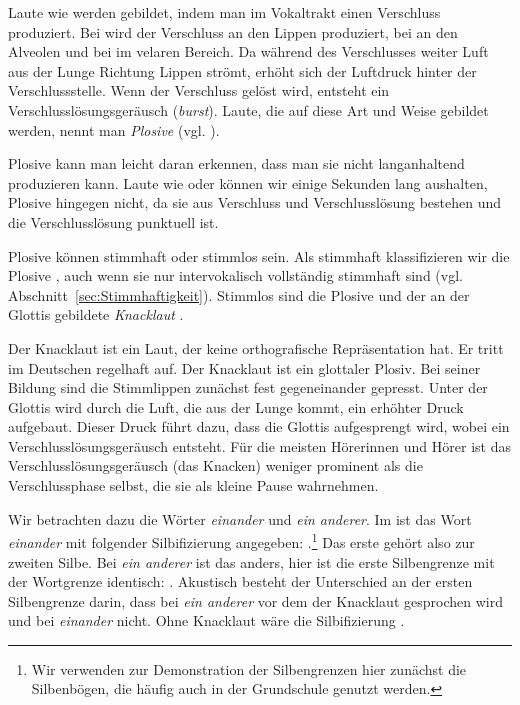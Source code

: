 Laute wie \textipa{[p, d, k]} werden gebildet, indem man im Vokaltrakt einen Verschluss produziert. Bei \textipa{[p]}wird der Verschluss an den Lippen produziert, bei \textipa{[d]} an den Alveolen und bei \textipa{[k]} im velaren Bereich. Da während des Verschlusses weiter Luft aus der Lunge Richtung Lippen strömt, erhöht sich der Luftdruck hinter der Verschlussstelle. Wenn der Verschluss gelöst wird, entsteht ein Verschlusslösungsgeräusch (\textit{burst}). Laute, die auf diese Art und Weise gebildet werden, nennt man \textit{Plosive} (vgl. ).

Plosive kann man leicht daran erkennen, dass man sie nicht langanhaltend produzieren kann. Laute wie \textipa{[f], [s]} oder \textipa{[\c{c}]} können wir einige Sekunden lang aushalten, Plosive hingegen nicht, da sie aus Verschluss und Verschlusslösung bestehen und die Verschlusslösung punktuell ist.

Plosive können stimmhaft oder stimmlos sein. Als stimmhaft klassifizieren wir die Plosive \textipa{[b, d, g]}, auch wenn sie nur intervokalisch vollständig stimmhaft sind (vgl. Abschnitt~\ref{sec:Stimmhaftigkeit}). Stimmlos sind die Plosive \textipa{[p, t, k]} und der an der Glottis gebildete \textit{Knacklaut} \textipa{[P]}. 

Der Knacklaut ist ein Laut, der keine orthografische Repräsentation hat. Er tritt im Deutschen regelhaft auf. Der Knacklaut ist ein glottaler Plosiv. Bei seiner Bildung sind die Stimmlippen zunächst fest gegeneinander gepresst. Unter der Glottis wird durch die Luft, die aus der Lunge kommt, ein erhöhter Druck aufgebaut. Dieser Druck führt dazu, dass die Glottis aufgesprengt wird, wobei ein Verschlusslösungsgeräusch entsteht. Für die meisten Hörerinnen und Hörer ist das Verschlusslösungsgeräusch (das Knacken) weniger prominent als die Verschlussphase selbst, die sie als kleine Pause wahrnehmen.

Wir betrachten dazu die Wörter \textit{einander} und \textit{ein anderer}. Im \citet{DudenRechtschreibung2024} ist das Wort \textit{einander} mit folgender Silbifizierung angegeben: .\footnote{Wir verwenden zur Demonstration der Silbengrenzen hier zunächst die Silbenbögen, die häufig auch in der Grundschule genutzt werden.} Das erste \textipa{[n]} gehört also zur zweiten Silbe. Bei \textit{ein anderer} ist das anders, hier ist die erste Silbengrenze mit der Wortgrenze identisch:  . Akustisch besteht der Unterschied an der ersten Silbengrenze darin, dass bei \textit{ein anderer} vor dem \textipa{[a]} der Knacklaut gesprochen wird und bei \textit{einander} nicht. Ohne Knacklaut wäre die Silbifizierung .

